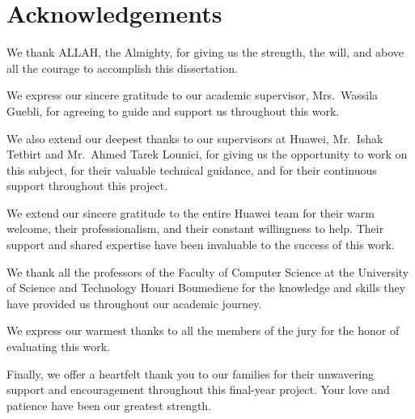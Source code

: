 \chapter*{Acknowledgements}

We thank ALLAH, the Almighty, for giving us the strength, the will, and above all the courage to accomplish this dissertation.

We express our sincere gratitude to our academic supervisor, Mrs.\ Wassila Guebli, for agreeing to guide and support us throughout this work.

We also extend our deepest thanks to our supervisors at Huawei, Mr.\ Ishak Tetbirt and Mr.\ Ahmed Tarek Lounici, for giving us the opportunity to work on this subject, for their valuable technical guidance, and for their continuous support throughout this project.

We extend our sincere gratitude to the entire Huawei team for their warm welcome, their professionalism, and their constant willingness to help. Their support and shared expertise have been invaluable to the success of this work.

We thank all the professors of the Faculty of Computer Science at the University of Science and Technology Houari Boumediene for the knowledge and skills they have provided us throughout our academic journey.

We express our warmest thanks to all the members of the jury for the honor of evaluating this work.

Finally, we offer a heartfelt thank you to our families for their unwavering support and encouragement throughout this final-year project. Your love and patience have been our greatest strength.
